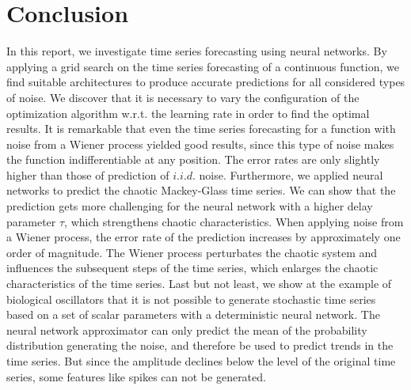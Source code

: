 
\section{Conclusion}

In this report, we investigate time series forecasting using neural networks.
By applying a grid search on the time series forecasting of a continuous 
function, we find suitable architectures to produce accurate predictions for 
all considered types of noise. We discover that it is necessary to vary the 
configuration of the optimization algorithm w.r.t. the learning rate in order 
to find the optimal results. It is remarkable that even the time series 
forecasting for a function with noise from a Wiener process yielded good 
results, since this type of noise makes the function indifferentiable at any 
position. The error rates are only slightly higher than those of prediction 
of $i.i.d.$ noise. Furthermore, we applied neural networks to predict the chaotic 
Mackey-Glass time series. We can show that the prediction gets more challenging
for the neural network with a higher delay parameter $\tau$, which strengthens
chaotic characteristics. When applying noise from a Wiener process, the error
rate of the prediction increases by approximately one order of magnitude. The
Wiener process perturbates the chaotic system and influences the subsequent
steps of the time series, which enlarges the chaotic characteristics of the 
time series. Last but not least, we show at the example of biological
oscillators that it is not possible to generate stochastic time series based on
a set of scalar parameters with a deterministic neural network. The neural
network approximator can only predict the mean of the probability distribution
generating the noise, and therefore be used to predict trends in the time 
series. But since the amplitude declines below the level of the original time 
series, some features like spikes can not be generated.
